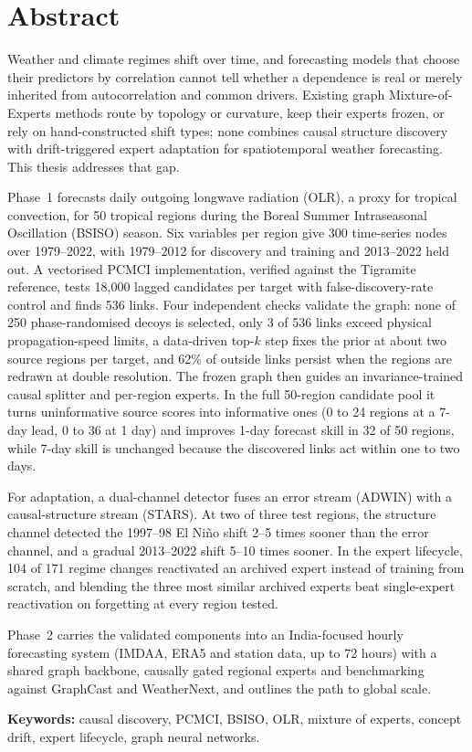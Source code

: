 \chapter*{Abstract}

Weather and climate regimes shift over time, and forecasting models that choose their predictors by correlation cannot tell whether a dependence is real or merely inherited from autocorrelation and common drivers. Existing graph Mixture-of-Experts methods route by topology or curvature, keep their experts frozen, or rely on hand-constructed shift types; none combines causal structure discovery with drift-triggered expert adaptation for spatiotemporal weather forecasting. This thesis addresses that gap.

Phase~1 forecasts daily outgoing longwave radiation (OLR), a proxy for tropical convection, for 50 tropical regions during the Boreal Summer Intraseasonal Oscillation (BSISO) season. Six variables per region give 300 time-series nodes over 1979--2022, with 1979--2012 for discovery and training and 2013--2022 held out. A vectorised PCMCI implementation, verified against the Tigramite reference, tests 18{,}000 lagged candidates per target with false-discovery-rate control and finds 536 links. Four independent checks validate the graph: none of 250 phase-randomised decoys is selected, only 3 of 536 links exceed physical propagation-speed limits, a data-driven top-$k$ step fixes the prior at about two source regions per target, and 62\% of outside links persist when the regions are redrawn at double resolution. The frozen graph then guides an invariance-trained causal splitter and per-region experts. In the full 50-region candidate pool it turns uninformative source scores into informative ones (0 to 24 regions at a 7-day lead, 0 to 36 at 1 day) and improves 1-day forecast skill in 32 of 50 regions, while 7-day skill is unchanged because the discovered links act within one to two days.

For adaptation, a dual-channel detector fuses an error stream (ADWIN) with a causal-structure stream (STARS). At two of three test regions, the structure channel detected the 1997--98 El Ni\~{n}o shift 2--5 times sooner than the error channel, and a gradual 2013--2022 shift 5--10 times sooner. In the expert lifecycle, 104 of 171 regime changes reactivated an archived expert instead of training from scratch, and blending the three most similar archived experts beat single-expert reactivation on forgetting at every region tested.

Phase~2 carries the validated components into an India-focused hourly forecasting system (IMDAA, ERA5 and station data, up to 72 hours) with a shared graph backbone, causally gated regional experts and benchmarking against GraphCast and WeatherNext, and outlines the path to global scale.

\vspace{0.3cm}
\noindent\textbf{Keywords:} causal discovery, PCMCI, BSISO, OLR, mixture of experts, concept drift, expert lifecycle, graph neural networks.
